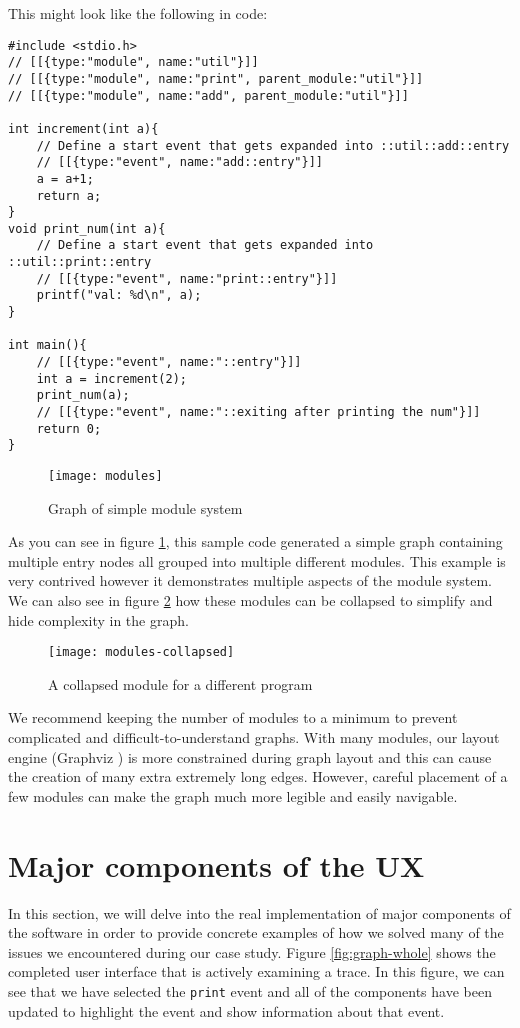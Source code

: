 \noindent This might look like the following in code:
\begin{verbatim}
#include <stdio.h>
// [[{type:"module", name:"util"}]]
// [[{type:"module", name:"print", parent_module:"util"}]]
// [[{type:"module", name:"add", parent_module:"util"}]]

int increment(int a){
    // Define a start event that gets expanded into ::util::add::entry
    // [[{type:"event", name:"add::entry"}]]
    a = a+1;
    return a;
}
void print_num(int a){
    // Define a start event that gets expanded into ::util::print::entry
    // [[{type:"event", name:"print::entry"}]]
    printf("val: %d\n", a);
}

int main(){
    // [[{type:"event", name:"::entry"}]]
    int a = increment(2);
    print_num(a);
    // [[{type:"event", name:"::exiting after printing the num"}]]
    return 0;
}
\end{verbatim}
\begin{figure}[!ht]
    \centering
\texttt{[image: modules]}
    \caption{Graph of simple module system}
    \label{fig:modules}
\end{figure}

As you can see in figure \ref{fig:modules}, this sample code generated a simple graph containing multiple entry nodes all grouped into multiple different modules. This example is very contrived however it demonstrates multiple aspects of the module system. We can also see in figure \ref{fig:modules-collapsed} how these modules can be collapsed to simplify and hide complexity in the graph.


\begin{figure}[!ht]
\centering
\texttt{[image: modules-collapsed]}
\caption{A collapsed module for a different program}
    \label{fig:modules-collapsed}
\end{figure}
We recommend keeping the number of modules to a minimum to prevent complicated and difficult-to-understand graphs. With many modules, our layout engine (Graphviz \cite{graphviz}) is more constrained during graph layout and this can cause the creation of many extra extremely long edges. However, careful placement of a few modules can make the graph much more legible and easily navigable. 

\section{Major components of the UX}
In this section, we will delve into the real implementation of major components of the software in order to provide concrete examples of how we solved many of the issues we encountered during our case study. Figure \ref{fig:graph-whole} shows the completed user interface that is actively examining a trace. In this figure, we can see that we have selected the \texttt{print} event and all of the components have been updated to highlight the event and show information about that event. 

